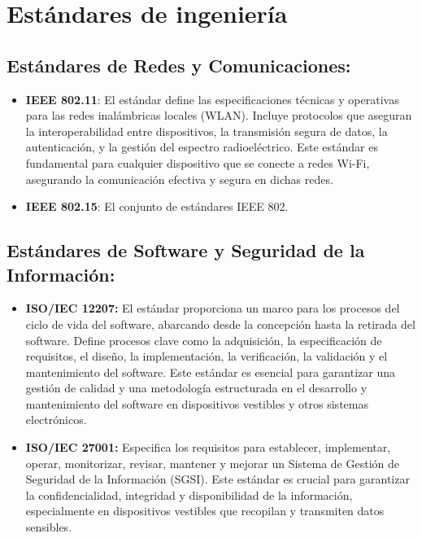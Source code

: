
\section{Estándares de ingeniería}

\subsection{Estándares de Redes y Comunicaciones:}

\begin{itemize}
  \item \textbf{IEEE 802.11}: El estándar define las especificaciones técnicas y operativas para las redes inalámbricas locales (WLAN). Incluye protocolos que aseguran la interoperabilidad entre dispositivos, la transmisión segura de datos, la autenticación, y la gestión del espectro radioeléctrico. Este estándar es fundamental para cualquier dispositivo que se conecte a redes Wi-Fi, asegurando la comunicación efectiva y segura en dichas redes.

  \item \textbf{IEEE 802.15}: El conjunto de estándares IEEE 802.
\end{itemize}



\subsection{Estándares de Software y Seguridad de la Información:}

\begin{itemize}
  \item \textbf{ISO/IEC 12207:} El estándar proporciona un marco para los procesos del ciclo de vida del software, abarcando desde la concepción hasta la retirada del software. Define procesos clave como la adquisición, la especificación de requisitos, el diseño, la implementación, la verificación, la validación y el mantenimiento del software. Este estándar es esencial para garantizar una gestión de calidad y una metodología estructurada en el desarrollo y mantenimiento del software en dispositivos vestibles y otros sistemas electrónicos. 

  \item \textbf{ISO/IEC 27001:} Especifica los requisitos para establecer, implementar, operar, monitorizar, revisar, mantener y mejorar un Sistema de Gestión de Seguridad de la Información (SGSI). Este estándar es crucial para garantizar la confidencialidad, integridad y disponibilidad de la información, especialmente en dispositivos vestibles que recopilan y transmiten datos sensibles. 

\end{itemize}

